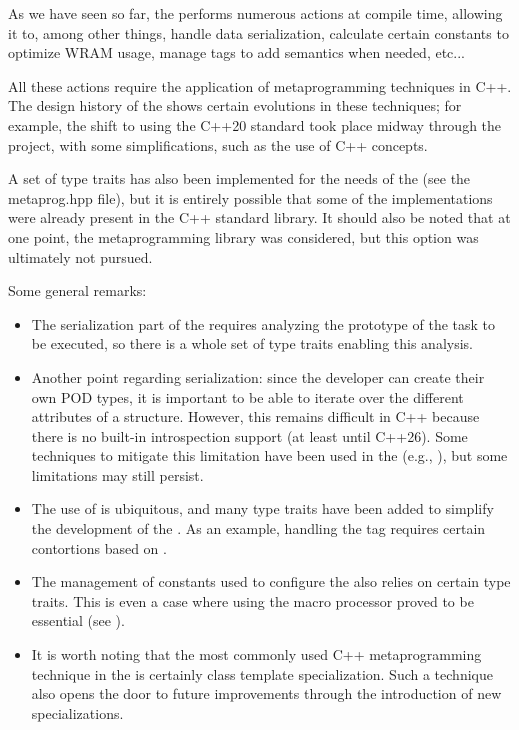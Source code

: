 As we have seen so far, the \BPL performs numerous actions at compile time, allowing it to, among other things, 
handle data serialization, calculate certain constants to optimize WRAM usage, 
manage tags to add semantics when needed, etc...

All these actions require the application of metaprogramming techniques in C++. 
The design history of the \BPL shows certain evolutions in these techniques; 
for example, the shift to using the C++20 standard took place midway through the project, 
with some simplifications, such as the use of C++ concepts.

A set of type traits has also been implemented for the needs of the \BPL (see the metaprog.hpp file), 
but it is entirely possible that some of the implementations were already present in the C++ standard library.
It should also be noted that at one point, the  metaprogramming library was considered, 
but this option was ultimately not pursued.

Some general remarks:
\begin{itemize}
\item The serialization part of the \BPL requires analyzing the prototype of the task to be executed, so there is a
 whole set of type traits enabling this analysis.
\item Another point regarding serialization: since the developer can create their own POD types, it is important to 
be able to iterate over the different attributes of a structure. However, this remains difficult in C++ because there is 
no built-in introspection support (at least until C++26). Some techniques to mitigate this limitation have been used in 
the \BPL (e.g., ), but some limitations may still persist.
\item The use of  is ubiquitous, and many type traits have been added to simplify the development of the \BPL. 
As an example, handling the  tag requires certain contortions based on .
\item The management of constants used to configure the \BPL also relies on certain type traits. 
This is even a case where using the macro processor proved to be essential (see ).
\item It is worth noting that the most commonly used C++ metaprogramming technique in the \BPL is certainly 
class template specialization. Such a technique also opens the door to future improvements through the introduction 
of new specializations.
\end{itemize}



 

